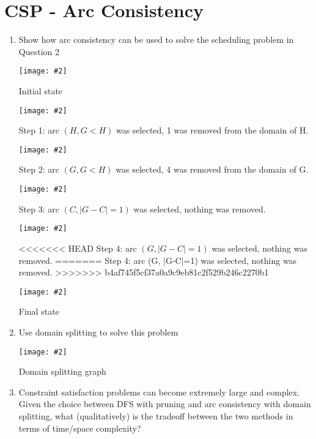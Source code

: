 \documentclass{article}
\newcommand{\centerfig}[2]{\begin{center}\texttt{[image: \#2]}\end{center}}
\begin{document}
\section{CSP - Arc Consistency}
\begin{enumerate}[label=(\alph*)]
    \item Show how arc consistency can be used to solve the scheduling problem in Question 2
    \centerfig{0.7}{../figs/q3_a_1.jpeg}
    {
        \begin{center}\color{ans}
            Initial state
        \end{center}
    }
    \centerfig{0.7}{../figs/q3_a_2.jpeg}
    {
        \begin{center}\color{ans}
            Step 1: arc $(H, G<H)$ was selected, 1 was removed from the domain of H.
        \end{center}
    }
    \centerfig{0.7}{../figs/q3_a_3.jpeg}
    {
        \begin{center}\color{ans}
            Step 2: arc $(G, G<H)$ was selected, 4 was removed from the domain of G.
        \end{center}
    }
    \centerfig{0.7}{../figs/q3_a_4.jpeg}
    {
        \begin{center}\color{ans}
            Step 3: arc $(C, |G-C|=1)$ was selected, nothing was removed.
        \end{center}
    }
    \centerfig{0.7}{../figs/q3_a_2.jpeg}
    {
        \begin{center}\color{ans}
<<<<<<< HEAD
            Step 4: arc $(G, |G-C|=1)$ was selected, nothing was removed.
=======
            Step 4: arc (G, |G-C|=1) was selected, nothing was removed.
>>>>>>> b4af745f5cf37a0a9c9eb81c2f529b246c2270b1
        \end{center}
    }
    \centerfig{0.7}{../figs/q3_a_6.jpeg}
    {
        \begin{center}\color{ans}
            Final state
        \end{center}
    }
    \item Use domain splitting to solve this problem
    \centerfig{0.8}{../figs/q3_b.png}
    {
        \begin{center}\color{ans}
            Domain splitting graph
        \end{center}
    }
    \item Constraint satisfaction problems can become extremely large and complex. Given the choice between DFS with pruning and arc consistency with domain splitting, what (qualitatively) is the tradeoff between the two methods in terms of time/space complexity? \\ \\

\end{enumerate}
\end{document}
